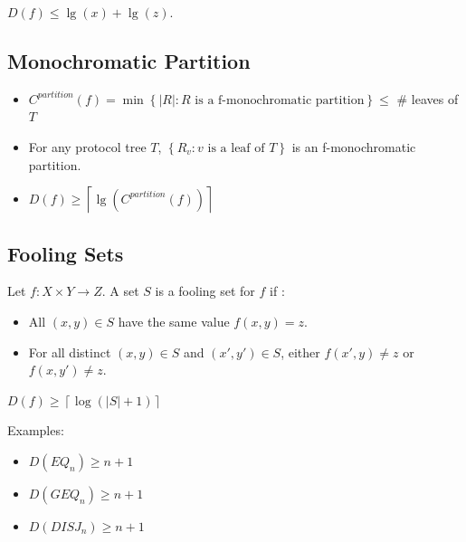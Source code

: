\documentclass[10pt,landscape,a4paper]{article}
\newcommand{\set}[1]{\left \{ #1 \right \}}
\newcommand{\abs}[1]{\left | #1 \right |}
\newcommand{\ceil}[1]{\left \lceil #1 \right \rceil}
\begin{document}
\begin{multicols*}{3}
$D(f) \leq \lg(x) + \lg(z)$.

\subsection{Monochromatic Partition}

\begin{itemize}
    \item $C^{partition} (f) = \min \set{\abs{R}: R \text{ is a f-monochromatic partition}} \leq $ \# leaves of $T$
    \item For any protocol tree $T$, $\set{R_v: v \text{ is a leaf of } T}$ is an f-monochromatic partition.
    \item $D(f) \geq \ceil{\lg(C^{partition} (f))}$
\end{itemize}

\subsection{Fooling Sets}

Let $f: X \times Y \rightarrow Z$. A set $S$ is a fooling set for $f$ if :

\begin{itemize}
    \item All $(x, y) \in S$ have the same value $f(x, y) = z$.
    \item For all distinct $(x, y) \in S$ and $(x', y') \in S$, either $f(x', y) \neq z$ or $f(x, y') \neq z$.
\end{itemize}

$D(f) \geq \ceil{\log(\abs{S} + 1)}$

Examples:

\begin{itemize}
    \item $D(EQ_n) \geq n + 1$
    \item $D(GEQ_n) \geq n + 1$
    \item $D(DISJ_n) \geq n + 1$
\end{itemize}

\end{multicols*}
\end{document}
